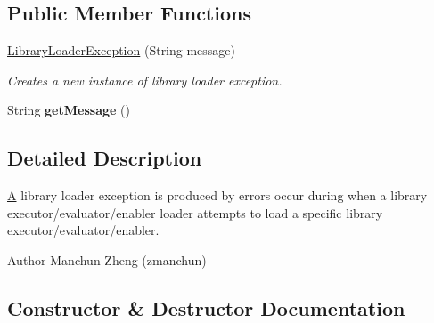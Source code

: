 \subsection*{Public Member Functions}
\begin{DoxyCompactItemize}
\item 
\hyperlink{classedu_1_1udel_1_1cis_1_1vsl_1_1civl_1_1semantics_1_1IF_1_1LibraryLoaderException_ae2c297c7dd376a1964863f45bcd77659}{Library\+Loader\+Exception} (String message)
\begin{DoxyCompactList}\small\item\em Creates a new instance of library loader exception. \end{DoxyCompactList}\item 
\hypertarget{classedu_1_1udel_1_1cis_1_1vsl_1_1civl_1_1semantics_1_1IF_1_1LibraryLoaderException_a22e1878e9fefbb4071bf6a916c9bc021}{}String {\bfseries get\+Message} ()\label{classedu_1_1udel_1_1cis_1_1vsl_1_1civl_1_1semantics_1_1IF_1_1LibraryLoaderException_a22e1878e9fefbb4071bf6a916c9bc021}

\end{DoxyCompactItemize}


\subsection{Detailed Description}
\hyperlink{structA}{A} library loader exception is produced by errors occur during when a library executor/evaluator/enabler loader attempts to load a specific library executor/evaluator/enabler. 

\begin{DoxyAuthor}{Author}
Manchun Zheng (zmanchun) 
\end{DoxyAuthor}


\subsection{Constructor \& Destructor Documentation}
\hypertarget{classedu_1_1udel_1_1cis_1_1vsl_1_1civl_1_1semantics_1_1IF_1_1LibraryLoaderException_ae2c297c7dd376a1964863f45bcd77659}{}

